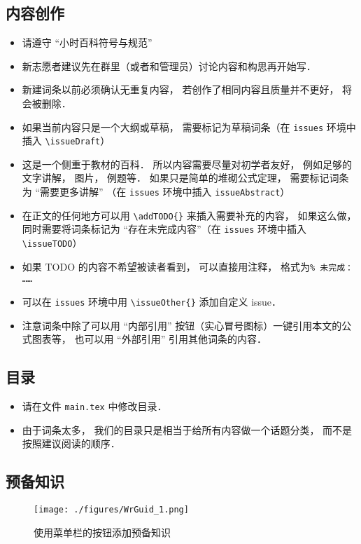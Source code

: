 
\begin{issues}
\issueTODO 
\end{issues}

\subsection{内容创作}
\begin{itemize}
\item 请遵守 “小时百科符号与规范”
\item 新志愿者建议先在群里（或者和管理员）讨论内容和构思再开始写．
\item 新建词条以前必须确认无重复内容， 若创作了相同内容且质量并不更好， 将会被删除．
\item 如果当前内容只是一个大纲或草稿， 需要标记为草稿词条（在 \verb|issues| 环境中插入 \verb|\issueDraft|）
\item 这是一个侧重于教材的百科． 所以内容需要尽量对初学者友好， 例如足够的文字讲解， 图片， 例题等． 如果只是简单的堆砌公式定理， 需要标记词条为 “需要更多讲解” （在 \verb|issues| 环境中插入 \verb|issueAbstract|）
\item 在正文的任何地方可以用 \verb|\addTODO{}| 来插入需要补充的内容， 如果这么做， 同时需要将词条标记为 “存在未完成内容”（在 \verb|issues| 环境中插入 \verb|\issueTODO|）
\item 如果 TODO 的内容不希望被读者看到， 可以直接用注释， 格式为\verb|% 未完成： ……|
\item 可以在 \verb|issues| 环境中用 \verb|\issueOther{}| 添加自定义 issue．
\item 注意词条中除了可以用 “内部引用” 按钮（实心冒号图标）一键引用本文的公式图表等， 也可以用 “外部引用” 引用其他词条的内容．
\end{itemize}

\subsection{目录}
\begin{itemize}
\item 请在文件 \verb|main.tex| 中修改目录．
\item 由于词条太多， 我们的目录只是相当于给所有内容做一个话题分类， 而不是按照建议阅读的顺序．
\end{itemize}

\subsection{预备知识}
\begin{figure}[ht]
\centering
\texttt{[image: ./figures/WrGuid\_1.png]}
\caption{使用菜单栏的按钮添加预备知识} \label{WrGuid_fig1}
\end{figure}

